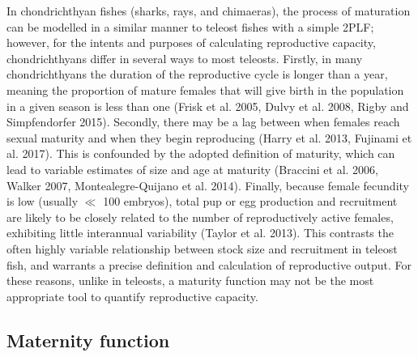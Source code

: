 \documentclass[
]{article}
\begin{document}
In chondrichthyan fishes (sharks, rays, and chimaeras), the process of maturation can be modelled in a similar manner to teleost fishes with a simple 2PLF; however, for the intents and purposes of calculating reproductive capacity, chondrichthyans differ in several ways to most teleosts. Firstly, in many chondrichthyans the duration of the reproductive cycle is longer than a year, meaning the proportion of mature females that will give birth in the population in a given season is less than one (Frisk et al. 2005, Dulvy et al. 2008, Rigby and Simpfendorfer 2015). Secondly, there may be a lag between when females reach sexual maturity and when they begin reproducing (Harry et al. 2013, Fujinami et al. 2017). This is confounded by the adopted definition of maturity, which can lead to variable estimates of size and age at maturity (Braccini et al. 2006, Walker 2007, Montealegre-Quijano et al. 2014). Finally, because female fecundity is low (usually \(\ll\) 100 embryos), total pup or egg production and recruitment are likely to be closely related to the number of reproductively active females, exhibiting little interannual variability (Taylor et al. 2013). This contrasts the often highly variable relationship between stock size and recruitment in teleost fish, and warrants a precise definition and calculation of reproductive output. For these reasons, unlike in teleosts, a maturity function may not be the most appropriate tool to quantify reproductive capacity.

\subsection{Maternity function}\label{maternity-function}
\end{document}
